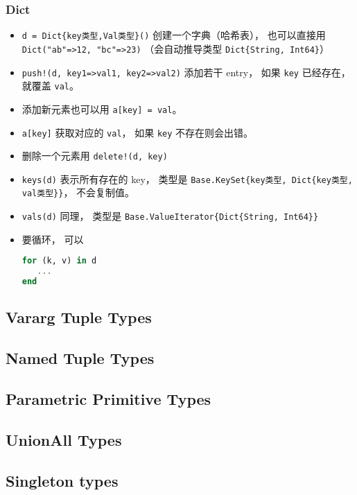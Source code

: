 \subsubsection{Dict}
\begin{itemize}
\item \verb|d = Dict{key类型,Val类型}()| 创建一个字典（哈希表）， 也可以直接用 \verb|Dict("ab"=>12, "bc"=>23)| （会自动推导类型 \verb|Dict{String, Int64}|）
\item \verb|push!(d, key1=>val1, key2=>val2)| 添加若干 entry， 如果 \verb|key| 已经存在， 就覆盖 \verb|val|。
\item 添加新元素也可以用 \verb|a[key] = val|。
\item \verb|a[key]| 获取对应的 \verb|val|， 如果 \verb|key| 不存在则会出错。
\item 删除一个元素用 \verb|delete!(d, key)|
\item \verb|keys(d)| 表示所有存在的 key， 类型是 \verb|Base.KeySet{key类型, Dict{key类型, val类型}}|， 不会复制值。
\item \verb|vals(d)| 同理， 类型是 \verb|Base.ValueIterator{Dict{String, Int64}}|
\item 要循环， 可以
\begin{lstlisting}[language=julia]
for (k, v) in d
   ...
end
\end{lstlisting}
\end{itemize}


\subsection{Vararg Tuple Types}

\subsection{Named Tuple Types}

\subsection{Parametric Primitive Types}

\subsection{UnionAll Types}

\subsection{Singleton types}

